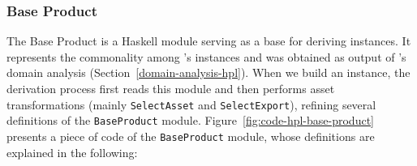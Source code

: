 \subsubsection{Base Product} \label{base-product}

The Base Product is a Haskell module serving as a base for deriving \hpl{} instances. It represents the commonality among \hpl's instances and was obtained as output of \hpl{}'s domain analysis (Section~\ref{domain-analysis-hpl}).  When we build an \hpl{} instance, the derivation process first reads this module and then performs \hp{} asset transformations (mainly \texttt{SelectAsset} and \texttt{SelectExport}), refining several definitions of the \texttt{BaseProduct} module. Figure~\ref{fig:code-hpl-base-product} presents a piece of code of the \texttt{BaseProduct} module, whose definitions are explained in the following:

